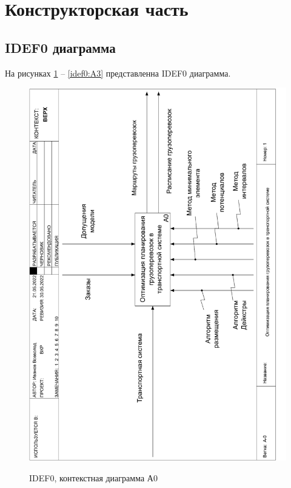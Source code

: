 \section{Конструкторская часть}
\subsection{IDEF0 диаграмма}
На рисунках \ref{idef0:top} -- \ref{idef0:A3} представленна IDEF0 диаграмма.

\begin{figure}[h]
	\begin{center}
		{\includegraphics[scale=0.63, angle=-90, page=1]{img/idef0/idef0.pdf}}
		\caption{IDEF0, контекстная диаграмма А0}
		\label{idef0:top}
	\end{center}
\end{figure}

